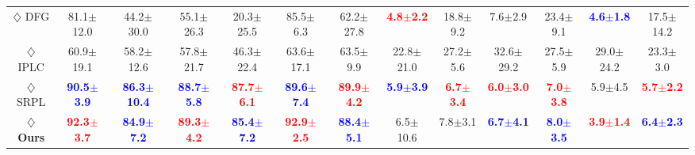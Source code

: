 \begin{table}[tbp]
{\begin{tabular}{@{}c@{\hspace{0.15cm}} cccccc cccccc@{}}
$\diamondsuit$ DFG \cite{DFG} & {81.1$\pm$12.0} & {44.2$\pm$30.0} & {55.1$\pm$26.3} & {20.3$\pm$25.5} & {85.5$\pm$6.3} & {62.2$\pm$27.8} & \textcolor{red}{\textbf{4.8$\pm$2.2}} & {18.8$\pm$9.2} & {7.6$\pm$2.9} & {23.4$\pm$9.1} & \textcolor{blue}{\textbf{4.6$\pm$1.8}} & {17.5$\pm$14.2} \\
$\diamondsuit$ IPLC \cite{iplc} & {60.9$\pm$19.1} & {58.2$\pm$12.6} & {57.8$\pm$21.7} & {46.3$\pm$22.4} & {63.6$\pm$17.1} & {63.5$\pm$9.9} & {22.8$\pm$21.0} & {27.2$\pm$5.6} & {32.6$\pm$29.2} & {27.5$\pm$5.9} & {29.0$\pm$24.2} & {23.3$\pm$3.0} \\
$\diamondsuit$ SRPL \cite{SRPL} & \textcolor{blue}{\textbf{90.5$\pm$3.9}} &  \textcolor{blue}{\textbf{86.3$\pm$10.4}} &  \textcolor{blue}{\textbf{88.7$\pm$5.8}} &  \textcolor{red}{\textbf{87.7$\pm$6.1}} &  \textcolor{blue}{\textbf{89.6$\pm$7.4}} &  \textcolor{red}{\textbf{89.9$\pm$4.2}} & \textcolor{blue}{\textbf{5.9$\pm$3.9}} &  \textcolor{red}{\textbf{6.7$\pm$3.4}} &  \textcolor{red}{\textbf{6.0$\pm$3.0}} &  \textcolor{red}{\textbf{7.0$\pm$3.8}} & {5.9$\pm$4.5} &  \textcolor{red}{\textbf{5.7$\pm$2.2}} \\
\midrule
\textbf{$\diamondsuit$ Ours} & \textcolor{red}{\textbf{92.3$\pm$3.7}} & \textcolor{blue}{\textbf{84.9$\pm$7.2}} & \textcolor{red}{\textbf{89.3$\pm$4.2}} & \textcolor{blue}{\textbf{85.4$\pm$7.2}} & \textcolor{red}{\textbf{92.9$\pm$2.5}} & \textcolor{blue}{\textbf{88.4$\pm$5.1}} & {6.5$\pm$10.6} & {7.8$\pm$3.1} & \textcolor{blue}{\textbf{6.7$\pm$4.1}} & \textcolor{blue}{\textbf{8.0$\pm$3.5}} & \textcolor{red}{\textbf{3.9$\pm$1.4}} & \textcolor{blue}{\textbf{6.4$\pm$2.3}} \\
\bottomrule
\end{tabular}
}
\vspace{-3mm}
\end{table}
